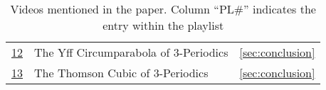 \begin{table}
\begin{tabular}{c|l|l}
\href{https://youtu.be/Sm9g5lqhZbk}{12} & The Yff Circumparabola of 3-Periodics &
\ref{sec:conclusion} \\

\href{https://youtu.be/s-h72iorZKw}{13} & The Thomson Cubic of 3-Periodics &
\ref{sec:conclusion} \\


\end{tabular}
\caption{Videos mentioned in the paper. Column ``PL\#'' indicates the entry within the playlist \cite{reznik2020-playlist-circum}}
\label{tab:playlist}
\end{table}

